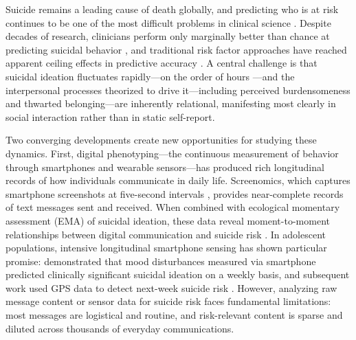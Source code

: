 \documentclass[review,12pt,authoryear]{elsarticle}
\begin{document}
Suicide remains a leading cause of death globally, and predicting who is at risk continues to be one of the most difficult problems in clinical science \citep{franklin2017risk}. Despite decades of research, clinicians perform only marginally better than chance at predicting suicidal behavior \citep{large2017meta}, and traditional risk factor approaches have reached apparent ceiling effects in predictive accuracy \citep{belsher2019prediction}. A central challenge is that suicidal ideation fluctuates rapidly---on the order of hours \citep{kleiman2017examination}---and the interpersonal processes theorized to drive it---including perceived burdensomeness and thwarted belonging---are inherently relational, manifesting most clearly in social interaction rather than in static self-report.

Two converging developments create new opportunities for studying these dynamics. First, digital phenotyping---the continuous measurement of behavior through smartphones and wearable sensors---has produced rich longitudinal records of how individuals communicate in daily life. Screenomics, which captures smartphone screenshots at five-second intervals \citep{reeves2021screenomics}, provides near-complete records of text messages sent and received. When combined with ecological momentary assessment (EMA) of suicidal ideation, these data reveal moment-to-moment relationships between digital communication and suicide risk \citep{ammerman2026beyond}. In adolescent populations, intensive longitudinal smartphone sensing has shown particular promise: \citet{auerbach2023intensive} demonstrated that mood disturbances measured via smartphone predicted clinically significant suicidal ideation on a weekly basis, and subsequent work used GPS data to detect next-week suicide risk \citep{auerbach2025gps}. However, analyzing raw message content or sensor data for suicide risk faces fundamental limitations: most messages are logistical and routine, and risk-relevant content is sparse and diluted across thousands of everyday communications.
\end{document}
